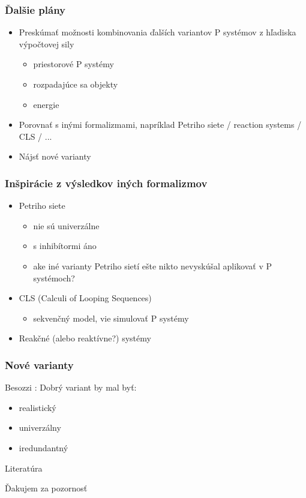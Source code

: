 \documentclass{beamer}
\begin{document}
\begin{frame}[t]\frametitle{Ďalšie plány}
\begin{itemize}
  \item Preskúmať možnosti kombinovania ďalších variantov P systémov z hľadiska výpočtovej sily
  \begin{itemize}
    \item priestorové P systémy
    \item rozpadajúce sa objekty
    \item energie
  \end{itemize}
  \item Porovnať s inými formalizmami, napríklad Petriho siete / reaction systems / CLS / ...
  \item Nájsť nové varianty
\end{itemize}
\end{frame}


\begin{frame}[t]\frametitle{Inšpirácie z výsledkov iných formalizmov}
\begin{itemize}
  \item Petriho siete
  \begin{itemize}
    \item nie sú univerzálne
    \item s inhibítormi áno
    \item ake iné varianty Petriho sietí ešte nikto nevyskúšal aplikovať v P systémoch?
  \end{itemize}
  \item CLS (Calculi of Looping Sequences)
  \begin{itemize}
    \item sekvenčný model, vie simulovať P systémy \cite{Barbuti07CLS}
  \end{itemize}
  \item Reakčné (alebo reaktívne?) systémy
\end{itemize}
\end{frame}

\begin{frame}[t]\frametitle{Nové varianty}
Besozzi \cite{Besozzi:PhD:2004}: Dobrý variant by mal byť:
\begin{itemize}
  \item realistický
  \item univerzálny
  \item iredundantný
\end{itemize}
\end{frame}


\begin{frame}[allowframebreaks]{Literatúra}


\end{frame}

\begin{frame}[plain]
\begin{center}
  Ďakujem za pozornosť
\end{center}
\end{frame}
\end{document}
